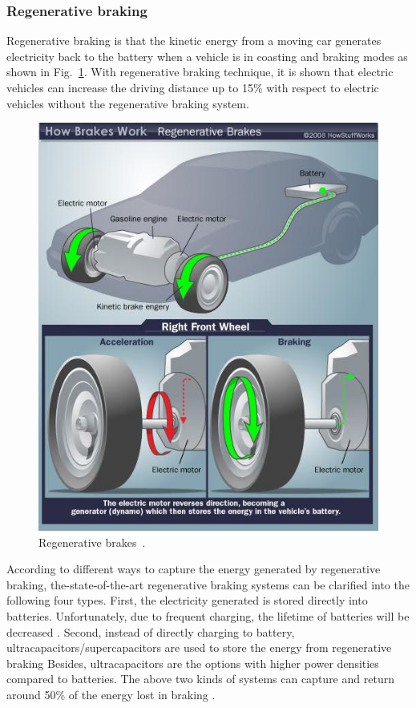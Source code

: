 \subsubsection{Regenerative braking}

Regenerative braking is that the kinetic energy from a moving car generates electricity back to the battery when a vehicle is in coasting and braking modes as shown in Fig.~\ref{fig:JX_break}.
With regenerative braking technique, it is shown that electric vehicles can increase the driving distance up to 15\% with respect to electric vehicles without the regenerative braking system.

\begin{figure}
\centering
\includegraphics[width=1.0\hsize]{Figures/Jason_Xue/JX_brake.jpg}
\caption{Regenerative brakes~\cite{JX_regen_fig}.}
\label{fig:JX_break}
\end{figure}      

According to different ways to capture the energy generated by regenerative braking, the-state-of-the-art regenerative braking systems can be clarified into the following four types.
First, the electricity generated is stored directly into batteries.
Unfortunately, due to frequent charging, the lifetime of batteries will be decreased \cite{JX_4450599,JX_4677669}.
Second, instead of directly charging to battery, ultracapacitors/supercapacitors are used to store the energy from regenerative braking \cite{JX_5764539,JX_5446335}
Besides, ultracapacitors are the options with higher power densities compared to batteries.
The above two kinds of systems can capture and return around 50\% of the energy lost in braking \cite{JX_DATE,JX_Tie2013}.

